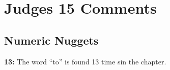 \section{Judges 15 Comments}

\subsection{Numeric Nuggets}
\textbf{13: } The word ``to'' is found 13 time sin the chapter.

